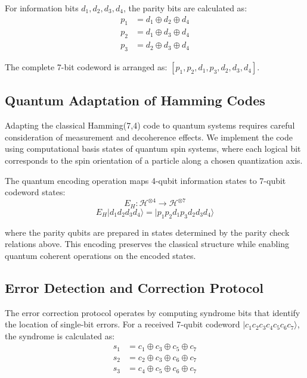 \documentclass[12pt,a4paper]{article}
\begin{document}
For information bits $d_1, d_2, d_3, d_4$, the parity bits are calculated as:
\begin{align}
p_1 &= d_1 \oplus d_2 \oplus d_4\\
p_2 &= d_1 \oplus d_3 \oplus d_4\\
p_3 &= d_2 \oplus d_3 \oplus d_4
\end{align}

The complete 7-bit codeword is arranged as: $[p_1, p_2, d_1, p_3, d_2, d_3, d_4]$.

\subsection{Quantum Adaptation of Hamming Codes}

Adapting the classical Hamming(7,4) code to quantum systems requires careful consideration of measurement and decoherence effects. We implement the code using computational basis states of quantum spin systems, where each logical bit corresponds to the spin orientation of a particle along a chosen quantization axis.

The quantum encoding operation maps 4-qubit information states to 7-qubit codeword states:
\begin{equation}
E_H: \mathcal{H}^{\otimes 4} \rightarrow \mathcal{H}^{\otimes 7}
\end{equation}
\begin{equation}
E_H|d_1d_2d_3d_4\rangle = |p_1p_2d_1p_3d_2d_3d_4\rangle
\end{equation}

where the parity qubits are prepared in states determined by the parity check relations above. This encoding preserves the classical structure while enabling quantum coherent operations on the encoded states.

\subsection{Error Detection and Correction Protocol}

The error correction protocol operates by computing syndrome bits that identify the location of single-bit errors. For a received 7-qubit codeword $|c_1c_2c_3c_4c_5c_6c_7\rangle$, the syndrome is calculated as:
\begin{align}
s_1 &= c_1 \oplus c_3 \oplus c_5 \oplus c_7\\
s_2 &= c_2 \oplus c_3 \oplus c_6 \oplus c_7\\
s_3 &= c_4 \oplus c_5 \oplus c_6 \oplus c_7
\end{align}
\end{document}
